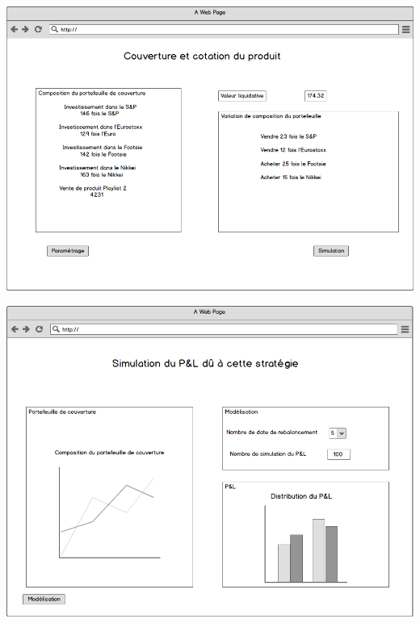 \documentclass[french,12pt,a4paper]{article}
\begin{document}
\begin{center}
\includegraphics[scale=0.4]{../Maquette_4.png}
\end{center}

\begin{center}
\includegraphics[scale=0.4]{../Maquette_5.png}
\end{center}
\end{document}
